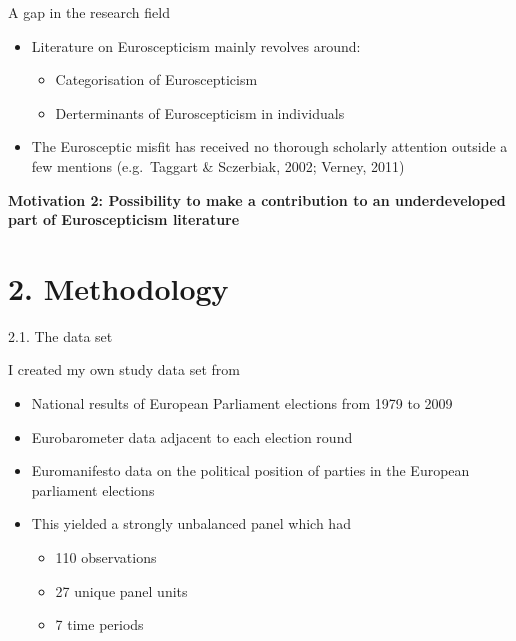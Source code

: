 \begin{frame}{A gap in the research field}

\begin{itemize}
\tightlist
\item
  Literature on Euroscepticism mainly revolves around:

  \begin{itemize}
  \tightlist
  \item
    Categorisation of Euroscepticism
  \item
    Derterminants of Euroscepticism in individuals
  \end{itemize}
\item
  The Eurosceptic misfit has received no thorough scholarly attention
  outside a few mentions (e.g.~Taggart \& Sczerbiak, 2002; Verney, 2011)
\end{itemize}

\textbf{Motivation 2: Possibility to make a contribution to an
underdeveloped part of Euroscepticism literature}

\end{frame}

\section{2. Methodology}\label{methodology}

\begin{frame}{2.1. The data set}

I created my own study data set from

\begin{itemize}
\item
  National results of European Parliament elections from 1979 to 2009
\item
  Eurobarometer data adjacent to each election round
\item
  Euromanifesto data on the political position of parties in the
  European parliament elections
\item
  This yielded a strongly unbalanced panel which had

  \begin{itemize}
  \tightlist
  \item
    110 observations\\
  \item
    27 unique panel units\\
  \item
    7 time periods
  \end{itemize}
\end{itemize}

\end{frame}

